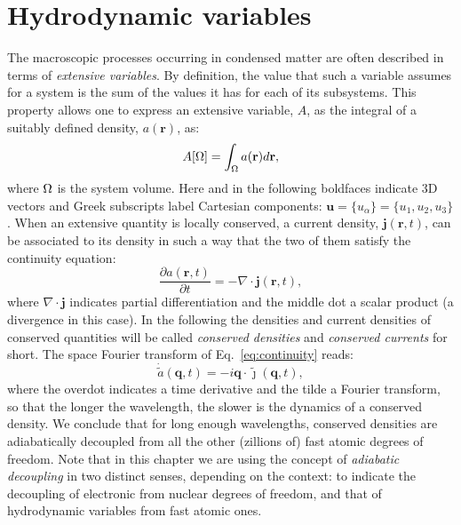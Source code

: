 \section{Hydrodynamic variables} \label{sec:hydrodyn_var}
The macroscopic processes occurring in condensed matter are often described in terms of \emph{extensive variables}. By definition, the value that such a variable assumes for a system is the sum of the values it has for each of its subsystems. This property allows one to express an extensive variable, $A$, as the integral of a suitably defined density, $a(\mathbf{r})$, as:
\begin{equation}
A[\rOmega]=\int_\rOmega a(\mathbf{r})d\mathbf{r}, \label{eq:A-extensivity}
\end{equation}
where ${\mathrm\Omega}$ is the system volume. Here and in the following boldfaces indicate 3D vectors and Greek subscripts label Cartesian components: $\mathbf{u}= \{u_\alpha\} = \{u_1,u_2,u_3\}$. When an extensive quantity is locally conserved, a current density, $\bm{j}(\mathbf{r},t)$, can be associated to its density in such a way that the two of them satisfy the continuity equation:
\begin{equation}
\frac{\partial a(\mathbf{r},t)}{\partial t} = - \nabla\cdot\bm{j}(\mathbf{r},t), \label{eq:continuity}
\end{equation}
where $\nabla\cdot\bm{j}$ indicates partial differentiation and the middle dot a scalar product (a divergence in this case). In the following the densities and current densities of conserved quantities will be called \emph{conserved densities} and \emph{conserved currents} for short. The space Fourier transform of Eq.~\eqref{eq:continuity} reads:
\begin{equation}
\dot{\tilde a}(\mathbf{q},t) = - i\mathbf{q} \cdot \tilde {\bm{\jmath}} (\mathbf{q},t), \label{eq:kontinuity}\end{equation}
where the overdot indicates a time derivative and the tilde a Fourier transform, so that the longer the wavelength, the slower is the dynamics of a conserved density. We conclude that for long enough wavelengths, conserved densities are adiabatically decoupled from all the other (zillions of) fast atomic degrees of freedom. Note that in this chapter we are using the concept of \emph{adiabatic decoupling} in two distinct senses, depending on the context: to indicate the decoupling of electronic from nuclear degrees of freedom, and that of hydrodynamic variables from fast atomic ones.


